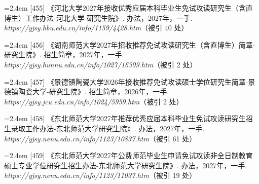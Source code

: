 {\vspace{0.6pt}
\vspace{3.5pt}\par
\nopagebreak\vspace{1pt}
\noindent\hangindent=2.4em \label{src:S0604}{\color{cAccent}[455]} 《河北大学2027年接收优秀应届本科毕业生免试攻读研究生（含直博生）工作办法-河北大学-研究生院》. 办法，2027年，一手. \textit{https://yjsy.hbu.edu.cn/info/1159/4428.htm}（被引 40 处）\par
\vspace{0.6pt}
\vspace{3.5pt}\par
\nopagebreak\vspace{1pt}
\noindent\hangindent=2.4em \label{src:S0605}{\color{cAccent}[456]} 《湖南师范大学2027年招收推荐免试攻读研究生（含直博生）简章-研究生院》. 招生简章，2027年，一手. \textit{https://yjsy.hunnu.edu.cn/info/1027/16309.htm}（被引 2 处）\par
\vspace{0.6pt}
\vspace{3.5pt}\par
\nopagebreak\vspace{1pt}
\noindent\hangindent=2.4em \label{src:S0606}{\color{cAccent}[457]} 《景德镇陶瓷大学2026年接收推荐免试攻读硕士学位研究生简章-景德镇陶瓷大学-研究生院》. 招生简章，2026年，一手. \textit{https://yjsy.jcu.edu.cn/info/1024/5959.htm}（被引 2 处）\par
\vspace{0.6pt}
\vspace{3.5pt}\par
\nopagebreak\vspace{1pt}
\noindent\hangindent=2.4em \label{src:S0607}{\color{cAccent}[458]} 《东北师范大学2027年推荐优秀应届本科毕业生免试攻读研究生招生录取工作办法-东北师范大学研究生院》. 办法，2027年，一手. \textit{https://yjsy.nenu.edu.cn/info/1123/10837.htm}（被引 61 处）\par
\vspace{0.6pt}
\noindent\hangindent=2.4em \label{src:S0609}{\color{cAccent}[459]} 《东北师范大学2027年公费师范毕业生申请免试攻读非全日制教育硕士专业学位研究生招生办法-东北师范大学研究生院》. 办法，2027年，一手. \textit{https://yjsy.nenu.edu.cn/info/1123/11037.htm}（被引 19 处）\par
}
